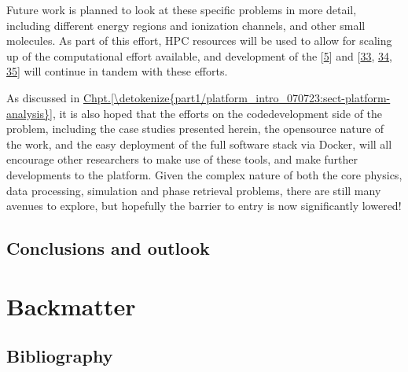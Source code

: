 \documentclass[letterpaper,table,10pt,english]{jupyterBook}
\begin{document}
\sphinxAtStartPar
Future work is planned to look at these specific problems in more detail, including different energy regions and ionization channels, and other small molecules. As part of this effort, HPC resources will be used to allow for scaling up of the computational effort available, and development of the  {[}\hyperlink{cite.backmatter/bibliography:id680}{5}{]} and  {[}\hyperlink{cite.backmatter/bibliography:id664}{33}, \hyperlink{cite.backmatter/bibliography:id606}{34}, \hyperlink{cite.backmatter/bibliography:id604}{35}{]} will continue in tandem with these efforts.

\sphinxAtStartPar
As discussed in \hyperref[\detokenize{part1/platform_intro_070723:sect-platform-analysis}]{Chpt.\@ \ref{\detokenize{part1/platform_intro_070723:sect-platform-analysis}}}, it is also hoped that the efforts on the code\sphinxhyphen{}development side of the problem, including the case studies presented herein, the open\sphinxhyphen{}source nature of the work, and the easy deployment of the full software stack via Docker, will all encourage other researchers to make use of these tools, and make further developments to the platform. Given the complex nature of both the core physics, data processing, simulation and phase retrieval problems, there are still many avenues to explore, but hopefully the barrier to entry is now significantly lowered!

\sphinxstepscope


\chapter{Conclusions and outlook}
\label{\detokenize{part2/conclusions_240723:conclusions-and-outlook}}\label{\detokenize{part2/conclusions_240723:chpt-conclusions}}\label{\detokenize{part2/conclusions_240723::doc}}
\sphinxstepscope


\part{Backmatter}

\sphinxstepscope


\chapter{Bibliography}
\label{\detokenize{backmatter/bibliography:bibliography}}\label{\detokenize{backmatter/bibliography::doc}}\label{\detokenize{backmatter/bibliography:id1}}
\sphinxstepscope
\end{document}
